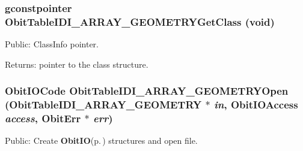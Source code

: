 \subsubsection{\setlength{\rightskip}{0pt plus 5cm}gconstpointer Obit\-Table\-IDI\_\-ARRAY\_\-GEOMETRYGet\-Class (void)}\label{ObitTableIDI__ARRAY__GEOMETRY_8h_a13}


Public: Class\-Info pointer. 

\begin{Desc}
\item[Returns:]pointer to the class structure. \end{Desc}
\subsubsection{\setlength{\rightskip}{0pt plus 5cm}Obit\-IOCode Obit\-Table\-IDI\_\-ARRAY\_\-GEOMETRYOpen ({\bf Obit\-Table\-IDI\_\-ARRAY\_\-GEOMETRY} $\ast$ {\em in}, Obit\-IOAccess {\em access}, {\bf Obit\-Err} $\ast$ {\em err})}\label{ObitTableIDI__ARRAY__GEOMETRY_8h_a17}


Public: Create {\bf Obit\-IO}{\rm (p.\,\pageref{structObitIO})} structures and open file. 

